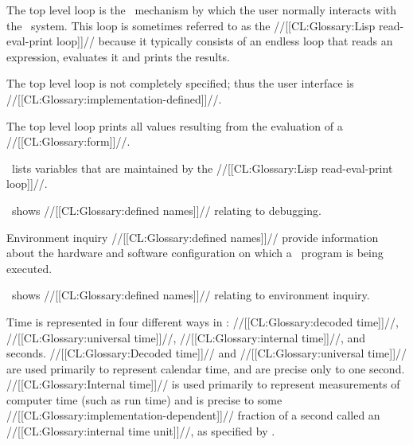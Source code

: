 



The top level loop is the \clisp\ mechanism by which the user normally
interacts with the \clisp\ system. This loop is sometimes referred to 
as the //[[CL:Glossary:Lisp read-eval-print loop]]//
because it typically consists of an endless loop that reads an expression,
evaluates it and prints the results.


The top level loop is not completely specified; thus the user
interface is //[[CL:Glossary:implementation-defined]]//.




The top level loop 
prints all values resulting from the evaluation of a 
//[[CL:Glossary:form]]//.

\Thenextfigure\ lists variables that are maintained by the //[[CL:Glossary:Lisp read-eval-print loop]]//.


\endSubsection%

 
\Thenextfigure\ shows //[[CL:Glossary:defined names]]// relating to
debugging.

 
\endsubsection%


Environment inquiry //[[CL:Glossary:defined names]]// provide information about
the hardware and software configuration on which a \clisp\ program is
being executed.

\Thenextfigure\ shows //[[CL:Glossary:defined names]]// relating to environment inquiry.



\endSubsection%



Time is represented in four different ways in \clisp:
    //[[CL:Glossary:decoded time]]//,
    //[[CL:Glossary:universal time]]//,
    //[[CL:Glossary:internal time]]//,
and seconds.
//[[CL:Glossary:Decoded time]]// and //[[CL:Glossary:universal time]]// are used primarily to represent calendar time,
and are precise only to one second.
//[[CL:Glossary:Internal time]]// is used primarily to represent measurements of computer
time (such as run time) and is precise to some //[[CL:Glossary:implementation-dependent]]//
fraction of a second called an //[[CL:Glossary:internal time unit]]//,
as specified by .






